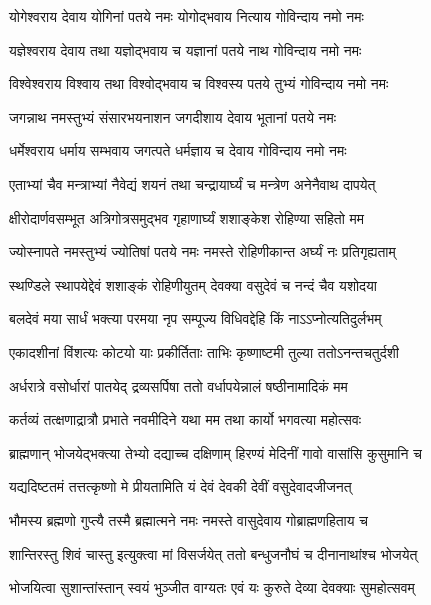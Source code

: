 \twolineshloka
{योगेश्वराय देवाय योगिनां पतये नमः}
{योगोद्भवाय नित्याय गोविन्दाय नमो नमः}%


\twolineshloka
{यज्ञेश्वराय देवाय तथा यज्ञोद्भवाय च}
{यज्ञानां पतये नाथ गोविन्दाय नमो नमः}%


\twolineshloka
{विश्वेश्वराय विश्वाय तथा विश्वोद्भवाय च}
{विश्वस्य पतये तुभ्यं गोविन्दाय नमो नमः}%


\twolineshloka
{जगन्नाथ नमस्तुभ्यं संसारभयनाशन}
{जगदीशाय देवाय भूतानां पतये नमः}%


\twolineshloka
{धर्मेश्वराय धर्माय सम्भवाय जगत्पते}
{धर्मज्ञाय च देवाय गोविन्दाय नमो नमः}%


\twolineshloka
{एताभ्यां चैव मन्त्राभ्यां नैवेद्यं शयनं तथा}
{चन्द्रायार्घ्यं च मन्त्रेण अनेनैवाथ दापयेत्}%


\twolineshloka
{क्षीरोदार्णवसम्भूत अत्रिगोत्रसमुद्भव}
{गृहाणार्घ्यं शशाङ्केश रोहिण्या सहितो मम}%


\twolineshloka
{ज्योस्नापते नमस्तुभ्यं ज्योतिषां पतये नमः}
{नमस्ते रोहिणीकान्त अर्घ्यं नः प्रतिगृह्यताम्}%


\twolineshloka
{स्थण्डिले स्थापयेद्देवं शशाङ्कं रोहिणीयुतम्}
{देवक्या वसुदेवं च नन्दं चैव यशोदया}%


\twolineshloka
{बलदेवं मया सार्धं भक्त्या परमया नृप}
{सम्पूज्य विधिवद्देहि किं नाऽऽप्नोत्यतिदुर्लभम्}%


\twolineshloka
{एकादशीनां विंशत्यः कोटयो याः प्रकीर्तिताः}
{ताभिः कृष्णाष्टमी तुल्या ततोऽनन्तचतुर्दशी}%


\twolineshloka
{अर्धरात्रे वसोर्धारां पातयेद् द्रव्यसर्पिषा}
{ततो वर्धापयेन्नालं षष्ठीनामादिकं मम}%


\twolineshloka
{कर्तव्यं तत्क्षणाद्रात्रौ प्रभाते नवमीदिने}
{यथा मम तथा कार्यो भगवत्या महोत्सवः}%


\twolineshloka
{ब्राह्मणान् भोजयेद्भक्त्या तेभ्यो दद्याच्च दक्षिणाम्}
{हिरण्यं मेदिनीं गावो वासांसि कुसुमानि च}%


\twolineshloka
{यद्यदिष्टतमं तत्तत्कृष्णो मे प्रीयतामिति}
{यं देवं देवकी देवीं वसुदेवादजीजनत्}%


\twolineshloka
{भौमस्य ब्रह्मणो गुप्त्यै तस्मै ब्रह्मात्मने नमः}
{नमस्ते वासुदेवाय गोब्राह्मणहिताय च}%


\twolineshloka
{शान्तिरस्तु शिवं चास्तु इत्युक्त्वा मां विसर्जयेत्}
{ततो बन्धुजनौघं च दीनानाथांश्च भोजयेत्}%


\twolineshloka
{भोजयित्वा सुशान्तांस्तान् स्वयं भुञ्जीत वाग्यतः}
{एवं यः कुरुते देव्या देवक्याः सुमहोत्सवम्}%



